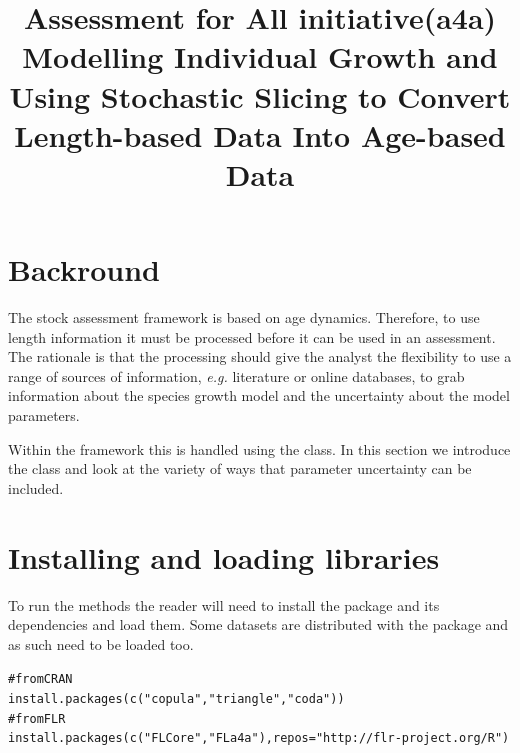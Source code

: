 \documentclass[a4paper,english,10pt]{article}\usepackage[]{graphicx}\usepackage[]{color}
\makeatletter
\newcommand{\hlstr}[1]{\textcolor[rgb]{0.063,0.58,0.627}{#1}}%
\newcommand{\hlcom}[1]{\textcolor[rgb]{0.588,0.588,0.588}{#1}}%
\newcommand{\hlstd}[1]{\textcolor[rgb]{0.196,0.196,0.196}{#1}}%
\newcommand{\hlkwc}[1]{\textcolor[rgb]{0,0.631,0.314}{#1}}%
\newcommand{\hlkwd}[1]{\textcolor[rgb]{0.78,0.227,0.412}{#1}}%
\newenvironment{kframe}{%
 \def\at@end@of@kframe{}%
 \ifinner\ifhmode%
  \def\at@end@of@kframe{\end{minipage}}%
  \begin{minipage}{\columnwidth}%
 \fi\fi%
 \def\FrameCommand##1{\hskip\@totalleftmargin \hskip-\fboxsep
 \colorbox{shadecolor}{##1}\hskip-\fboxsep
     \hskip-\linewidth \hskip-\@totalleftmargin \hskip\columnwidth}%
 \MakeFramed {\advance\hsize-\width
   \@totalleftmargin\z@ \linewidth\hsize
   \@setminipage}}%
 {\par\unskip\endMakeFramed%
 \at@end@of@kframe}
\newenvironment{knitrout}{}{} %
\makeatother
\begin{document}
\title{Assessment for All initiative(a4a) \\ Modelling Individual Growth and Using Stochastic Slicing to Convert Length-based Data Into Age-based Data}



\maketitle


\newpage
\tableofcontents
\newpage



\section{Backround}

The \aFa stock assessment framework is based on age dynamics. Therefore, to use length information it must be processed before it can be used in an assessment. The rationale is that the processing should give the analyst the flexibility to use a range of sources of information, \emph{e.g.} literature or online databases, to grab information about the species growth model and the uncertainty about the model parameters.

Within the \aFa framework this is handled using the  class. In this section we introduce the  class and look at the variety of ways that parameter uncertainty can be included.




\section{Installing and loading libraries}

To run the  methods the reader will need to install the package and its dependencies and load them. Some datasets are distributed with the package and as such need to be loaded too.

\begin{knitrout}
\color{fgcolor}\begin{kframe}
\begin{alltt}
\hlcom{# from CRAN}
\hlkwd{install.packages}\hlstd{(}\hlkwd{c}\hlstd{(}\hlstr{"copula"}\hlstd{,} \hlstr{"triangle"}\hlstd{,} \hlstr{"coda"}\hlstd{))}
\hlcom{# from FLR}
\hlkwd{install.packages}\hlstd{(}\hlkwd{c}\hlstd{(}\hlstr{"FLCore"}\hlstd{,} \hlstr{"FLa4a"}\hlstd{),} \hlkwc{repos} \hlstd{=} \hlstr{"http://flr-project.org/R"}\hlstd{)}
\end{alltt}
\end{kframe}
\end{knitrout}
\end{document}
